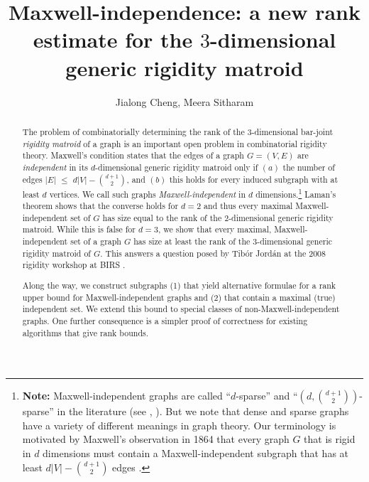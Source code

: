 \documentclass[10pt]{article}
\begin{document}
\title{Maxwell-independence: a new rank estimate for the $3$-dimensional generic rigidity matroid}
\author{Jialong Cheng\footnotemark[1]{  }\footnotemark[2]{}, Meera Sitharam\footnotemark[1]{}}
\date{}


\maketitle

\begin{abstract}
The problem of combinatorially determining the rank of the 3-dimensional
bar-joint {\em rigidity matroid} of a graph is an important open problem in
combinatorial rigidity theory. Maxwell's condition states that the edges of a graph $G=(V, E)$ are {\em independent} in its $d$-dimensional generic rigidity matroid only if $(a)$ the number of edges $|E|$ $\le$ $d|V| - {d+1\choose 2}$, and $(b)$ this holds for every induced subgraph with at least $d$ vertices. We call such graphs {\em Maxwell-independent} in $d$ dimensions.\footnote[2]{
{\bf Note:} Maxwell-independent graphs are called ``$d$-sparse''  and ``$(d, {d+1 \choose 2})$-sparse'' in the literature (see \cite{JacksonBound2011}, \cite{LeeStreinu2008}). But we note that dense and sparse graphs have a variety of different meanings in graph theory. Our terminology is motivated by Maxwell's observation in 1864 that every graph $G$ that is rigid in $d$ dimensions must contain a Maxwell-independent subgraph that has at least $d|V| -{d+1 \choose 2}$ edges \cite{maxwell:equilibrium:1864}.}
Laman's theorem shows that the converse holds for $d=2$ and thus every maximal Maxwell-independent set of $G$ has size equal to the  rank of the $2$-dimensional generic rigidity matroid. While this is
false for $d=3$, we show that every maximal, Maxwell-independent set of a graph $G$ has size at least the rank of the $3$-dimensional generic rigidity matroid of $G$. This answers a question posed by Tib\'or Jord\'an at the 2008 rigidity workshop at BIRS \cite{bib:birs}.

Along the way, we construct subgraphs (1) that yield alternative formulae for a rank upper bound for Maxwell-independent graphs and (2) that contain a maximal (true) independent set. We extend this bound to special classes of non-Maxwell-independent graphs. One further consequence is a simpler proof of
correctness for existing algorithms that give rank bounds.
\end{abstract}
\end{document}
